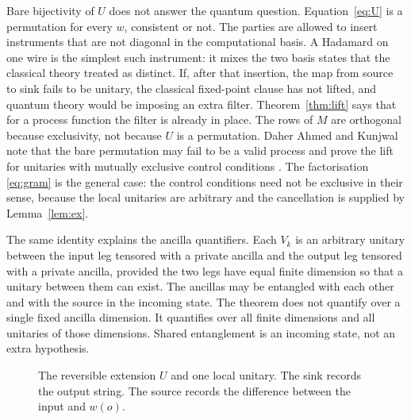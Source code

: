\documentclass[11pt]{article}
\theoremstyle{definition}
\theoremstyle{remark}
\begin{document}
Bare bijectivity of \(U\) does not answer the quantum question. Equation~\eqref{eq:U} is a permutation for every \(w\), consistent or not. The parties are allowed to insert instruments that are not diagonal in the computational basis. A Hadamard on one wire is the simplest such instrument: it mixes the two basis states that the classical theory treated as distinct. If, after that insertion, the map from source to sink fails to be unitary, the classical fixed-point clause has not lifted, and quantum theory would be imposing an extra filter. Theorem~\ref{thm:lift} says that for a process function the filter is already in place. The rows of \(M\) are orthogonal because exclusivity, not because \(U\) is a permutation. Daher Ahmed and Kunjwal note that the bare permutation may fail to be a valid process and prove the lift for unitaries with mutually exclusive control conditions \cite{daher2026}. The factorisation \eqref{eq:gram} is the general case: the control conditions need not be exclusive in their sense, because the local unitaries are arbitrary and the cancellation is supplied by Lemma~\ref{lem:ex}.

The same identity explains the ancilla quantifiers. Each \(V_k\) is an arbitrary unitary between the input leg tensored with a private ancilla and the output leg tensored with a private ancilla, provided the two legs have equal finite dimension so that a unitary between them can exist. The ancillas may be entangled with each other and with the source in the incoming state. The theorem does not quantify over a single fixed ancilla dimension. It quantifies over all finite dimensions and all unitaries of those dimensions. Shared entanglement is an incoming state, not an extra hypothesis.

\begin{figure}[t]
\centering
{}
\caption{The reversible extension \(U\) and one local unitary. The sink records the output string. The source records the difference between the input and \(w(o)\).}
\label{fig:lift}
\end{figure}
\end{document}
